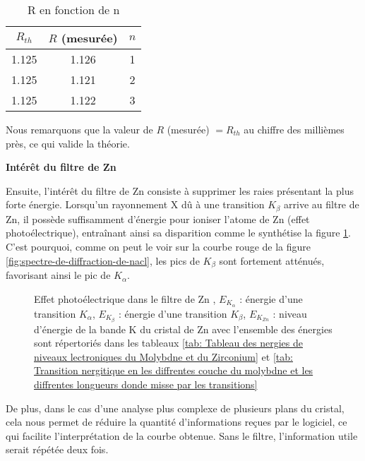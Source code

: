 	
	
	
	



\begin{table}[h!]
	\centering
	\begin{tabular}{|c|c|c|}
		\hline
		$R_{th}$& $R$ (mesurée) & $n$ \\ \hline
		1.125 &1.126 & 1 \\ \hline
		1.125 &1.121& 2 \\ \hline
		1.125 & 1.122& 3 \\ \hline
	\end{tabular}
	\caption{R en fonction de n}
	\label{tab:R en fonction de n}
\end{table}




Nous remarquons que la valeur de $R$ (mesurée) $= R_{th}$ au chiffre des millièmes près, ce qui valide la théorie.

 \begin{flushleft}
	\textbf{Intérêt du filtre de Zn}
\end{flushleft}







 
Ensuite, l'intérêt du filtre de Zn consiste à supprimer les raies présentant la plus forte énergie. Lorsqu'un rayonnement X dû à une transition $K_{\beta}$ arrive au filtre de Zn, il possède suffisamment d'énergie pour ioniser l'atome de Zn (effet photoélectrique), entraînant ainsi sa disparition comme le synthétise la figure \ref{fig: Effet photoélectrique de le métal de Zn}. C'est pourquoi, comme on peut le voir sur la courbe rouge de la figure \ref{fig:spectre-de-diffraction-de-nacl}, les pics de $K_{\beta}$ sont fortement atténués, favorisant ainsi le pic de $K_{\alpha}$. 

\begin{figure}[h!]
	\centering
	
	\caption{\centering Effet photoélectrique dans le filtre de Zn , $E_{K_{\alpha}}$ : énergie d'une transition $K_{\alpha}$, $E_{K_{\beta}}$ : énergie d'une transition $K_{\beta}$, $E_{K_{Zn}}$ : niveau d'énergie de la bande K du cristal de Zn avec l'ensemble des énergies sont répertoriés dans les tableaux \ref{tab: Tableau des nergies de niveaux lectroniques du Molybdne et du Zirconium} et \ref{tab: Transition nergitique en les diffrentes couche du molybdne et les diffrentes longueurs donde misse par les transitions}}
	\label{fig: Effet photoélectrique de le métal de Zn}
\end{figure}


De plus, dans le cas d'une analyse plus complexe de plusieurs plans du cristal, cela nous permet de réduire la quantité d'informations reçues par le logiciel, ce qui facilite l'interprétation de la courbe obtenue. Sans le filtre, l'information utile serait répétée deux fois.






